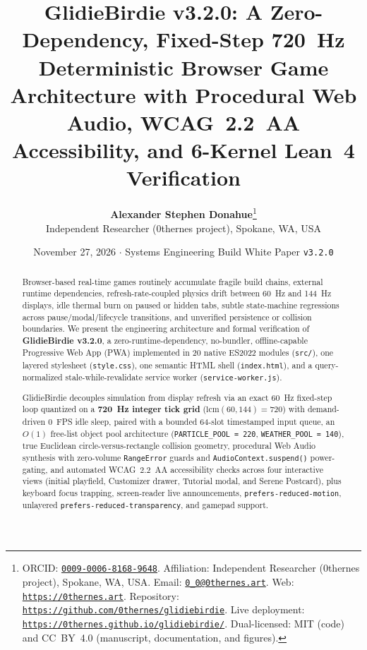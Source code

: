 \documentclass[11pt,letterpaper]{article}
\title{\vspace{-1.0em}\textbf{GlidieBirdie v3.2.0: A Zero-Dependency, Fixed-Step 720~Hz Deterministic Browser Game Architecture with Procedural Web Audio, WCAG~2.2~AA Accessibility, and 6-Kernel Lean~4 Verification}}
\author{%
  \textbf{Alexander Stephen Donahue}\thanks{%
    ORCID: \href{https://orcid.org/0009-0006-8168-9648}{\texttt{0009-0006-8168-9648}}.
    Affiliation: Independent Researcher (0thernes project), Spokane, WA, USA.
    Email: \href{mailto:0_0@0thernes.art}{\texttt{0\_0@0thernes.art}}.
    Web: \href{https://0thernes.art}{\texttt{https://0thernes.art}}.
    Repository: \href{https://github.com/0thernes/glidiebirdie}{\texttt{https://github.com/0thernes/glidiebirdie}}.
    Live deployment: \href{https://0thernes.github.io/glidiebirdie/}{\texttt{https://0thernes.github.io/glidiebirdie/}}.
    Dual-licensed: MIT (code) and CC~BY~4.0 (manuscript, documentation, and figures).
  }\\
  \small Independent Researcher (0thernes project), Spokane, WA, USA
}
\date{November 27, 2026 \quad $\cdot$ \quad Systems Engineering Build White Paper \texttt{v3.2.0}}
\theoremstyle{remark}
\begin{document}
\maketitle
\thispagestyle{plain}

\begin{abstract}
Browser-based real-time games routinely accumulate fragile build chains, external runtime dependencies, refresh-rate-coupled physics drift between 60~Hz and 144~Hz displays, idle thermal burn on paused or hidden tabs, subtle state-machine regressions across pause/modal/lifecycle transitions, and unverified persistence or collision boundaries. We present the engineering architecture and formal verification of \textbf{GlidieBirdie v3.2.0}, a zero-runtime-dependency, no-bundler, offline-capable Progressive Web App (PWA) implemented in 20 native ES2022 modules (\texttt{src/}), one layered stylesheet (\texttt{style.css}), one semantic HTML shell (\texttt{index.html}), and a query-normalized stale-while-revalidate service worker (\texttt{service-worker.js}).

GlidieBirdie decouples simulation from display refresh via an exact 60~Hz fixed-step loop quantized on a \textbf{720~Hz integer tick grid} ($\mathrm{lcm}(60,144)=720$) with demand-driven 0~FPS idle sleep, paired with a bounded 64-slot timestamped input queue, an $O(1)$ free-list object pool architecture (\texttt{PARTICLE\_POOL = 220}, \texttt{WEATHER\_POOL = 140}), true Euclidean circle-versus-rectangle collision geometry, procedural Web Audio synthesis with zero-volume \texttt{RangeError} guards and \texttt{AudioContext.suspend()} power-gating, and automated WCAG~2.2~AA accessibility checks across four interactive views (initial playfield, Customizer drawer, Tutorial modal, and Serene Postcard), plus keyboard focus trapping, screen-reader live announcements, \texttt{prefers-reduced-motion}, unlayered \texttt{prefers-reduced-transparency}, and gamepad support.


\end{abstract}
\end{document}
